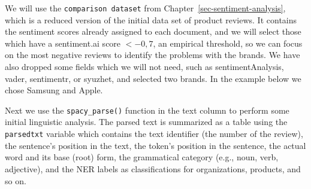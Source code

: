 We will use the \texttt{comparison\ dataset} from
Chapter~\ref{sec-sentiment-analysis}, which is a reduced version of the
initial data set of product reviews. It contains the sentiment scores
already assigned to each document, and we will select those which have a
sentiment.ai score \(<-0,7\), an empirical threshold, so we can focus on the
most negative reviews to identify the problems with
the brands. We have also dropped some fields which we will not need, such as
sentimentAnalysis, vader, sentimentr, or syuzhet, and selected two brands.
In the example below we chose Samsung and Apple.

\begin{Shaded}
\begin{Highlighting}[]

\NormalTok{(} \NormalTok{)}


\OtherTok{\textless{}{-}}\SpecialCharTok{\%\textgreater{}\%}
  \NormalTok{(}\SpecialCharTok{{-}}\SpecialCharTok{{-}}\SpecialCharTok{{-}}\SpecialCharTok{{-}}\SpecialCharTok{\%\textgreater{}\%}
  \SpecialCharTok{\textless{}} \SpecialCharTok{{-}} \NormalTok{(}\NormalTok{, }\NormalTok{)) }\SpecialCharTok{\%\textgreater{}\%}
  \NormalTok{(} \NormalTok{())}
\end{Highlighting}
\end{Shaded}

Next we use the \texttt{spacy\_parse()} function in the text column to
perform some initial linguistic analysis. The parsed text is summarized
as a table using the \texttt{parsedtxt} variable which contains the text
identifier (the number of the review), the sentence's position in the
text, the token's position in the sentence, the actual word and its base
(root) form, the grammatical category (e.g., noun, verb, adjective), and
the NER labels as classifications for organizations, products,
and so on.

